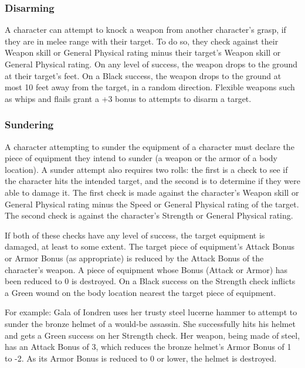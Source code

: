 \documentclass[oneside]{book}
\begin{document}
\begin{multicols}{2}
\subsubsection{Disarming}
A character can attempt to knock a weapon from another character's grasp, if they are in melee range with their target. To do so, they check against their Weapon skill or General Physical rating minus their target's Weapon skill or General Physical rating. On any level of success, the weapon drops to the ground at their target's feet. On a Black success, the weapon drops to the ground at most 10 feet away from the target, in a random direction. Flexible weapons such as whips and flails grant a +3 bonus to attempts to disarm a target.

\subsubsection{Sundering}
A character attempting to sunder the equipment of a character must declare the piece of equipment they intend to sunder (a weapon or the armor of a body location). A sunder attempt also requires two rolls: the first is a check to see if the character hits the intended target, and the second is to determine if they were able to damage it. The first check is made against the character's Weapon skill or General Physical rating minus the Speed or General Physical rating of the target. The second check is against the character's Strength or General Physical rating. 

If both of these checks have any level of success, the target equipment is damaged, at least to some extent. The target piece of equipment's Attack Bonus or Armor Bonus (as appropriate) is reduced by the Attack Bonus of the character's weapon. A piece of equipment whose Bonus (Attack or Armor) has been reduced to 0 is destroyed. On a Black success on the Strength check inflicts a Green wound on the body location nearest the target piece of equipment.  

For example: Gala of Iondren uses her trusty steel lucerne hammer to attempt to sunder the bronze helmet of a would-be assassin. She successfully hits his helmet and gets a Green success on her Strength check. Her weapon, being made of steel, has an Attack Bonus of 3, which reduces the bronze helmet's Armor Bonus of 1 to -2. As its Armor Bonus is reduced to 0 or lower, the helmet is destroyed. 


\end{multicols}
\end{document}
